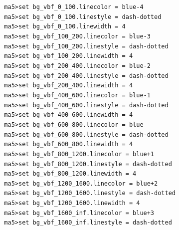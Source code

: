 \documentclass[a4paper, 10pt]{article}
\begin{document}
\texttt{ }\texttt{ }\texttt{ma5>set bg\_vbf\_0\_100.linecolor = blue-4\\
}
\texttt{ }\texttt{ }\texttt{ma5>set bg\_vbf\_0\_100.linestyle = dash-dotted\\
}
\texttt{ }\texttt{ }\texttt{ma5>set bg\_vbf\_0\_100.linewidth = 4\\
}
\texttt{ }\texttt{ }\texttt{ma5>set bg\_vbf\_100\_200.linecolor = blue-3\\
}
\texttt{ }\texttt{ }\texttt{ma5>set bg\_vbf\_100\_200.linestyle = dash-dotted\\
}
\texttt{ }\texttt{ }\texttt{ma5>set bg\_vbf\_100\_200.linewidth = 4\\
}
\texttt{ }\texttt{ }\texttt{ma5>set bg\_vbf\_200\_400.linecolor = blue-2\\
}
\texttt{ }\texttt{ }\texttt{ma5>set bg\_vbf\_200\_400.linestyle = dash-dotted\\
}
\texttt{ }\texttt{ }\texttt{ma5>set bg\_vbf\_200\_400.linewidth = 4\\
}
\texttt{ }\texttt{ }\texttt{ma5>set bg\_vbf\_400\_600.linecolor = blue-1\\
}
\texttt{ }\texttt{ }\texttt{ma5>set bg\_vbf\_400\_600.linestyle = dash-dotted\\
}
\texttt{ }\texttt{ }\texttt{ma5>set bg\_vbf\_400\_600.linewidth = 4\\
}
\texttt{ }\texttt{ }\texttt{ma5>set bg\_vbf\_600\_800.linecolor = blue\\
}
\texttt{ }\texttt{ }\texttt{ma5>set bg\_vbf\_600\_800.linestyle = dash-dotted\\
}
\texttt{ }\texttt{ }\texttt{ma5>set bg\_vbf\_600\_800.linewidth = 4\\
}
\texttt{ }\texttt{ }\texttt{ma5>set bg\_vbf\_800\_1200.linecolor = blue+1\\
}
\texttt{ }\texttt{ }\texttt{ma5>set bg\_vbf\_800\_1200.linestyle = dash-dotted\\
}
\texttt{ }\texttt{ }\texttt{ma5>set bg\_vbf\_800\_1200.linewidth = 4\\
}
\texttt{ }\texttt{ }\texttt{ma5>set bg\_vbf\_1200\_1600.linecolor = blue+2\\
}
\texttt{ }\texttt{ }\texttt{ma5>set bg\_vbf\_1200\_1600.linestyle = dash-dotted\\
}
\texttt{ }\texttt{ }\texttt{ma5>set bg\_vbf\_1200\_1600.linewidth = 4\\
}
\texttt{ }\texttt{ }\texttt{ma5>set bg\_vbf\_1600\_inf.linecolor = blue+3\\
}
\texttt{ }\texttt{ }\texttt{ma5>set bg\_vbf\_1600\_inf.linestyle = dash-dotted\\
}
\end{document}
